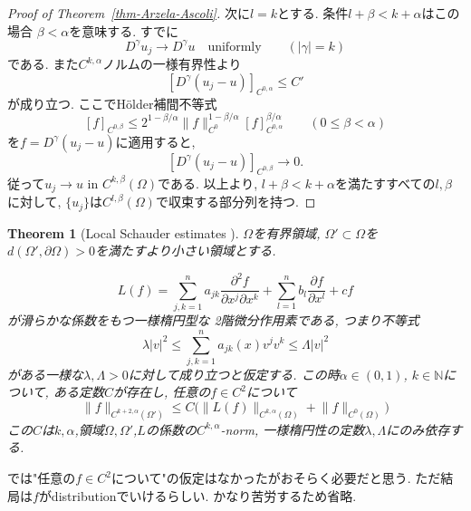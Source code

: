\documentclass[dvipdfmx,a4paper,11pt]{article} %
\newtheorem{thm}{Theorem}[section]
\theoremstyle{definition}
\theoremstyle{remark}
\numberwithin{equation}{section}
\begin{document}
\begin{proof}[Proof of Theorem~\ref{thm-Arzela-Ascoli}]
次に$l=k$とする. 条件$l+\beta<k+\alpha$はこの場合
$\beta<\alpha$を意味する. すでに
\[
  D^\gamma u_j\to D^\gamma u
  \quad \text{uniformly}
  \qquad (\lvert\gamma\rvert=k)
\]
である. また$C^{k,\alpha}$ノルムの一様有界性より
\[
  [D^\gamma(u_j-u)]_{C^{0,\alpha}}\leq C'
\]
が成り立つ. ここでH\"older補間不等式
\[
  [f]_{C^{0,\beta}}
  \leq
  2^{1-\beta/\alpha}
  \lVert f\rVert_{C^0}^{1-\beta/\alpha}
  [f]_{C^{0,\alpha}}^{\beta/\alpha}
  \qquad (0\leq \beta<\alpha)
\]
を$f=D^\gamma(u_j-u)$に適用すると,
\[
  [D^\gamma(u_j-u)]_{C^{0,\beta}}
  \longrightarrow 0.
\]
従って$u_j\to u$ in $C^{k,\beta}(\Omega)$である.
以上より, $l+\beta<k+\alpha$を満たすすべての$l,\beta$に対して,
$\{u_j\}$は$C^{l,\beta}(\Omega)$で収束する部分列を持つ.
\end{proof}


\begin{thm}[Local Schauder estimates {\cite[Theorem 2.7]{Sze14}}]
\label{thm-Sze-2.7}
$\Omega$を有界領域, 
$\Omega'\subset\Omega$を$d(\Omega',\partial\Omega)>0$を満たすより小さい領域とする. 

\[
L(f)=\sum_{j,k=1}^n a_{jk}\frac{\partial^2 f}{\partial x^j\partial x^k}
+\sum_{l=1}^n b_l\frac{\partial f}{\partial x^l}+cf
\]
が滑らかな係数をもつ一様楕円型な 2階微分作用素である, つまり不等式
\begin{equation}
\label{Sze-Schauder-18}
\lambda\lvert v\rvert^2\leq \sum_{j,k=1}^n a_{jk}(x)v^jv^k \leq \Lambda\lvert v\rvert^2
\end{equation}
がある一様な$\lambda,\Lambda>0$に対して成り立つと仮定する.
この時$\alpha\in(0,1)$, $k\in\mathbb{N}$について, 
ある定数$C$が存在し, 任意の$f \in C^2$について
\[
\lVert f\rVert_{C^{k+2,\alpha}(\Omega')}\leq C\bigl(\lVert L(f)\rVert_{C^{k,\alpha}(\Omega)}+\lVert f\rVert_{C^0(\Omega)}\bigr)
\]
この$C$は$k,\alpha$,領域$\Omega,\Omega'$,$L$の係数の$C^{k,\alpha}$-norm,  一様楕円性の定数$\lambda,\Lambda$にのみ依存する. 
\end{thm}
\cite[Theorem 2.7]{Sze14}では"任意の$f \in C^2$について"の仮定はなかったがおそらく必要だと思う.
ただ結局は$f$がdistributionでいけるらしい. かなり苦労するため省略.  
\end{document}
